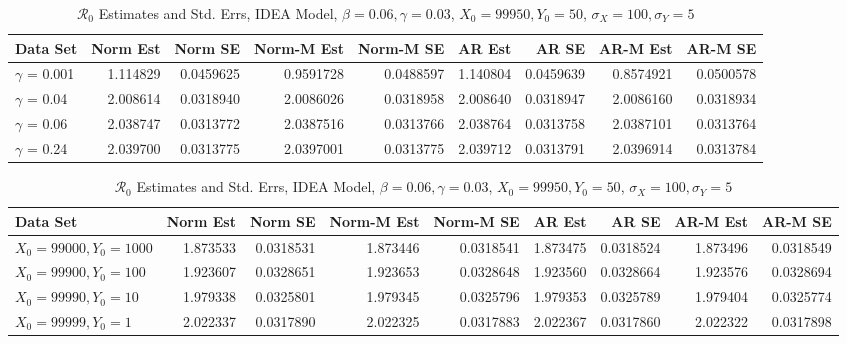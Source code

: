 \documentclass[12pt]{article}
\newcommand{\rr}{\ensuremath{\mathcal{R}_0}}
\begin{document}
\begin{table}[H]
	
	\caption{\label{tab:}$\rr$ Estimates and Std. Errs, IDEA Model,
		$\beta = 0.06, \gamma = 0.03$, $X_0 = 99950, Y_0 = 50$, $\sigma_X = 100, \sigma_Y = 5$}
	\centering
	\begin{tabular}[t]{l|r|r|r|r|r|r|r|r}
		\hline
		Data Set & Norm Est & Norm SE & Norm-M Est & Norm-M SE & AR Est & AR SE & AR-M Est & AR-M SE\\
		\hline
		$\gamma$ = 0.001 & 1.114829 & 0.0459625 & 0.9591728 & 0.0488597 & 1.140804 & 0.0459639 & 0.8574921 & 0.0500578\\
		\hline
		$\gamma$ = 0.04 & 2.008614 & 0.0318940 & 2.0086026 & 0.0318958 & 2.008640 & 0.0318947 & 2.0086160 & 0.0318934\\
		\hline
		$\gamma$ = 0.06 & 2.038747 & 0.0313772 & 2.0387516 & 0.0313766 & 2.038764 & 0.0313758 & 2.0387101 & 0.0313764\\
		\hline
		$\gamma$ = 0.24 & 2.039700 & 0.0313775 & 2.0397001 & 0.0313775 & 2.039712 & 0.0313791 & 2.0396914 & 0.0313784\\
		\hline
	\end{tabular}
\end{table}

\begin{table}[H]
	
	\caption{\label{tab:}$\rr$ Estimates and Std. Errs, IDEA Model,
		$\beta = 0.06, \gamma = 0.03$, $X_0 = 99950, Y_0 = 50$, $\sigma_X = 100, \sigma_Y = 5$}
	\centering
	\begin{tabular}[t]{l|r|r|r|r|r|r|r|r}
		\hline
		Data Set & Norm Est & Norm SE & Norm-M Est & Norm-M SE & AR Est & AR SE & AR-M Est & AR-M SE\\
		\hline
		$X_0 = 99000, Y_0 = 1000$ & 1.873533 & 0.0318531 & 1.873446 & 0.0318541 & 1.873475 & 0.0318524 & 1.873496 & 0.0318549\\
		\hline
		$X_0 = 99900, Y_0 = 100$ & 1.923607 & 0.0328651 & 1.923653 & 0.0328648 & 1.923560 & 0.0328664 & 1.923576 & 0.0328694\\
		\hline
		$X_0 = 99990, Y_0 = 10$ & 1.979338 & 0.0325801 & 1.979345 & 0.0325796 & 1.979353 & 0.0325789 & 1.979404 & 0.0325774\\
		\hline
		$X_0 = 99999, Y_0 = 1$& 2.022337 & 0.0317890 & 2.022325 & 0.0317883 & 2.022367 & 0.0317860 & 2.022322 & 0.0317898\\
		\hline
	\end{tabular}
\end{table}
\end{document}
